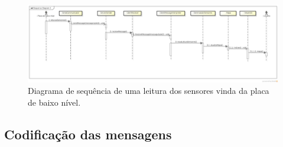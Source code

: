 \begin{figure}[H]
  \centering
  \includegraphics[width=\textwidth, keepaspectratio]{./figuras/diagrama_sequencia_sensores.png}
  \caption{Diagrama de sequência de uma leitura dos sensores vinda da placa de baixo nível.}
  \label{fig:diagrama_sequencia_sensores}
\end{figure}


\subsection{Codificação das mensagens}
\label{sec:codificacao_mensagens}

